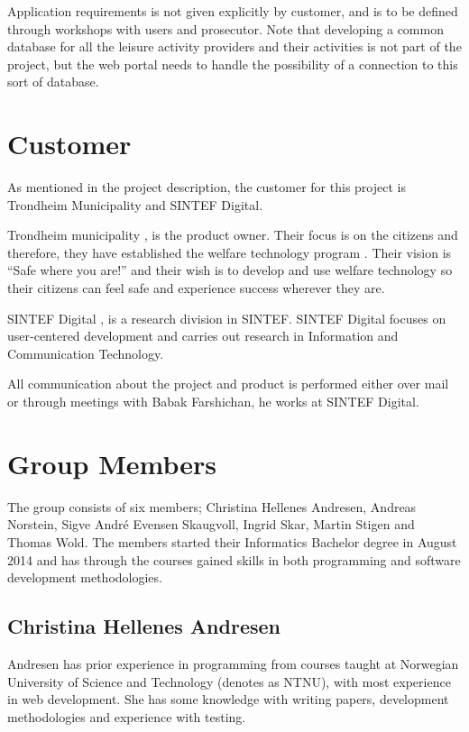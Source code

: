 Application requirements is not given explicitly by customer, and is to be defined through workshops with users and prosecutor. Note that developing a common database for all the leisure activity providers and their activities is not part of the project, but the web portal needs to handle the possibility of a connection to this sort of database.  


\section{Customer}
As mentioned in the project description, the customer for this project is Trondheim Municipality and SINTEF Digital. 

Trondheim municipality \cite{TrondheimMunicipality}, is the product owner. Their focus is on the citizens and therefore, they have established the welfare technology program \cite{WelfareProgram}. Their vision is “Safe where you are!” and their wish is to develop and use welfare technology so their citizens can feel safe and experience success wherever they are. 

SINTEF Digital \cite{SintefDigital}, is a research division in SINTEF. SINTEF Digital focuses on user-centered development and carries out research in Information and Communication Technology.

All communication about the project and product is performed either over mail or through meetings with Babak Farshichan, he works at SINTEF Digital.


\section{Group Members}
The group consists of six members; Christina Hellenes Andresen, Andreas Norstein, Sigve André Evensen Skaugvoll, Ingrid Skar, Martin Stigen and Thomas Wold. The members started their Informatics Bachelor degree in August 2014 and has through the courses gained skills in both programming and software development methodologies. 

\subsection{Christina Hellenes Andresen}
Andresen has prior experience in programming from courses taught at Norwegian University of Science and Technology (denotes as NTNU), with most experience in web development. She has some knowledge with writing papers, development methodologies and experience with testing. 


